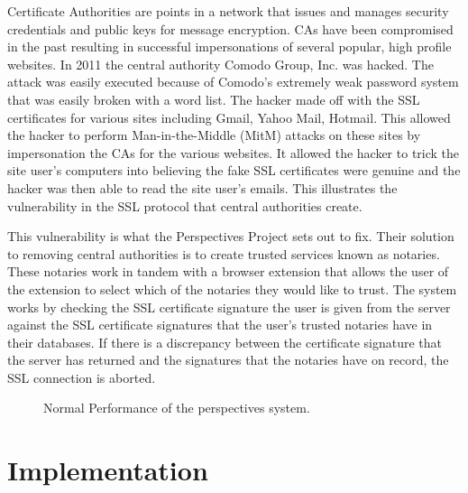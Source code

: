 \documentclass[preprint,review,12pt]{elsarticle}
\begin{document}
Certificate Authorities are points in a network that issues and manages
security credentials and public keys for message encryption. CAs have been 
compromised in the past resulting in successful impersonations
of several popular, high profile websites.  In 2011 the central authority
Comodo Group, Inc. was hacked. The attack was easily executed
because of Comodo's extremely weak password system that was easily broken with a word
list. The hacker made off with the SSL certificates for various sites including 
Gmail, Yahoo Mail, Hotmail.  \citep{comodohack}
This allowed the hacker to perform Man-in-the-Middle (MitM) attacks on these sites by
impersonation the CAs for the various websites. It allowed the hacker to trick the site
user's computers into believing the fake SSL certificates were genuine and the hacker was
then able to read the site user's emails.  This illustrates the vulnerability
in the SSL protocol that central authorities create.

This vulnerability is what the Perspectives Project sets out to fix. Their
solution to removing central authorities is to create trusted services known as
notaries. These notaries work in tandem with a browser extension that allows the
user of the extension to select which of the notaries they would like to
trust. The system works by checking the SSL certificate signature the user is
given from the server against the SSL certificate signatures that the user's
trusted notaries have in their databases. If there is a discrepancy between the
certificate signature that the server has returned and the signatures that the
notaries have on record, the SSL connection is aborted.

\begin{figure}[h]
\caption{Normal Performance of the perspectives system.}
\end{figure}

\section{Implementation}
\label{implementation}
\end{document}
